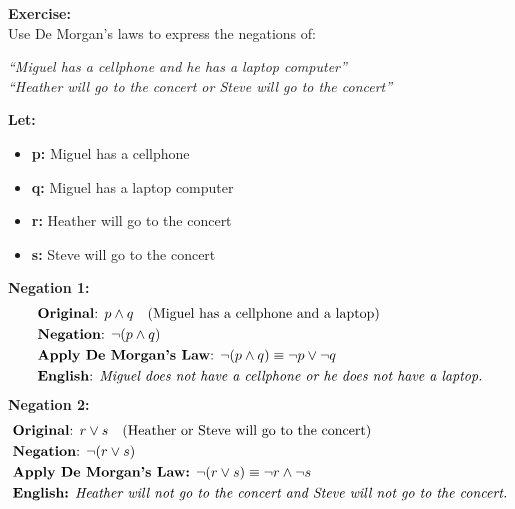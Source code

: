 \begin{tcolorbox}[title=Example 1: Using De Morgan's Laws]
\textbf{Exercise:}  
\\ Use De Morgan’s laws to express the negations of:  
\begin{center}
\textit{“Miguel has a cellphone and he has a laptop computer”}  \\
\textit{“Heather will go to the concert or Steve will go to the concert”}    
\end{center}

\textbf{Let:}  
\begin{itemize}
    \item \textbf{p:} Miguel has a cellphone
    \item \textbf{q:} Miguel has a laptop computer
    \item \textbf{r:} Heather will go to the concert
    \item \textbf{s:} Steve will go to the concert
\end{itemize}

\textbf{Negation 1:}   
\begin{align*}
&\text{\textbf{Original}: } p \land q \quad \text{(Miguel has a cellphone and a laptop)} \\
&\text{\textbf{Negation}: } \neg(p \land q) \\
&\text{\textbf{Apply De Morgan's Law}: } \neg(p \land q) \equiv \neg p \lor \neg q \\
&\text{\textbf{English}: } \textit{Miguel does not have a cellphone or he does not have a laptop.}
\end{align*}
\textbf{Negation 2:}   
\begin{align*}
&\text{\textbf{Original}: } r \lor s \quad \text{(Heather or Steve will go to the concert)} \\
&\text{\textbf{Negation}: } \neg(r \lor s) \\
&\text{\textbf{Apply De Morgan's Law:} } \neg(r \lor s) \equiv \neg r \land \neg s \\
&\text{\textbf{English:} } \textit{Heather will not go to the concert and Steve will not go to the concert.}
\end{align*}
\end{tcolorbox}



